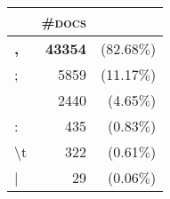 \begin{tabular}{lrr} 
 \toprule 
 & \textsc{\#docs} & \\ 
 \midrule 
\textbf{,}&\textbf{43354 }&(82.68$\%$)\\ 
  ;&5859 &(11.17$\%$)\\ 
   &2440 &(4.65$\%$)\\ 
  :&435 &(0.83$\%$)\\ 
  \textbackslash t&322 &(0.61$\%$)\\ 
  |&29 &(0.06$\%$)\\ 
  \bottomrule 
 \end{tabular}